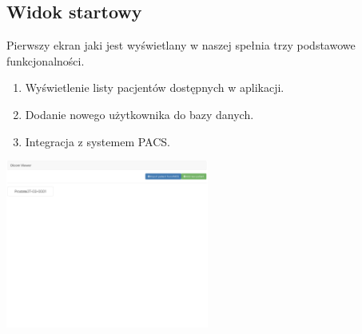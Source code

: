 \documentclass[a4paper,11pt,twoside]{report}
\theoremstyle{definition}
\begin{document}
\subsection{Widok startowy}
Pierwszy ekran jaki jest wyświetlany w naszej spełnia trzy podstawowe funkcjonalności.
\begin{enumerate}
\item Wyświetlenie listy pacjentów dostępnych w aplikacji.
\item Dodanie nowego użytkownika do bazy danych.
\item Integracja z systemem PACS.
\end{enumerate}

\begin{minipage}{\linewidth}
	\centering
	\includegraphics[width=0.5\textwidth]{FrontScreen/Main/0.png}
\end{minipage}
\end{document}
